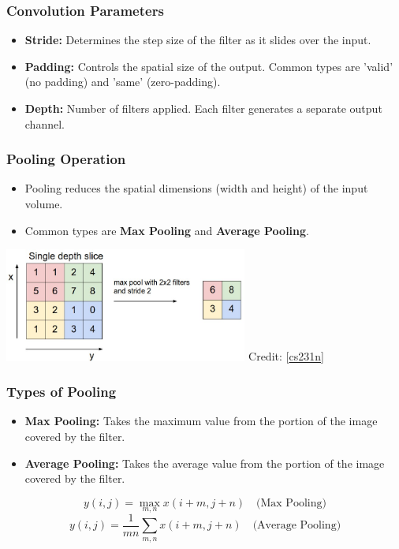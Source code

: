 \documentclass[aspectratio=169]{../latex_main/tntbeamer}  %
\begin{document}
    \begin{frame}
    \frametitle{Convolution Parameters}
    \begin{itemize}
        \item \textbf{Stride:} Determines the step size of the filter as it slides over the input.
        \item \textbf{Padding:} Controls the spatial size of the output. Common types are 'valid' (no padding) and 'same' (zero-padding).
        \item \textbf{Depth:} Number of filters applied. Each filter generates a separate output channel.
    \end{itemize}
    \end{frame}

    \begin{frame}
    \frametitle{Pooling Operation}
    \begin{itemize}
        \item Pooling reduces the spatial dimensions (width and height) of the input volume.
        \item Common types are \textbf{Max Pooling} and \textbf{Average Pooling}.
    \end{itemize}
        \centering
        \includegraphics[width=0.6\textwidth]{figure/maxpool.jpeg} Credit: [\href{https://cs231n.github.io/convolutional-networks/#overview}{cs231n}]
    \end{frame}
    
    \begin{frame}
    \frametitle{Types of Pooling}
    \begin{itemize}
        \item \textbf{Max Pooling:} Takes the maximum value from the portion of the image covered by the filter.
        \item \textbf{Average Pooling:} Takes the average value from the portion of the image covered by the filter.
    \end{itemize}
    \begin{equation}
        y(i,j) = \max_{m,n} x(i+m,j+n) \quad \text{(Max Pooling)}
    \end{equation}
    \begin{equation}
        y(i,j) = \frac{1}{mn}\sum_{m,n} x(i+m,j+n) \quad \text{(Average Pooling)}
    \end{equation}
    \end{frame}
    
\end{document}
